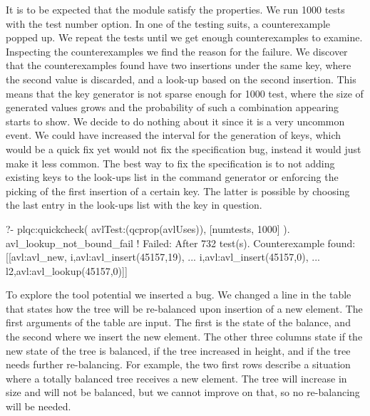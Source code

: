 It is to be expected that the module satisfy the properties.
%
We run 1000 tests with the test number option.
%
In one of the testing suits, a counterexample popped up.
%
We repeat the tests until we get enough counterexamples to examine.
%
Inspecting the counterexamples we find the reason for the failure.
%
We discover that the counterexamples found have two insertions under the
same key, where the second value is discarded, and a look-up based on
the second insertion.
%
This means that the key generator is not sparse enough for 1000 test,
where the size of generated values grows and the probability of such a
combination appearing starts to show.
%
We decide to do nothing about it since it is a very uncommon event.
%
We could have increased the interval for the generation of keys, which
would be a quick fix yet would not fix the specification bug, instead it would just
make it less common.
%
The best way to fix the specification is to not adding existing keys to
the look-ups list in the command generator or enforcing the picking of
the first insertion of a certain key.
%
The latter is possible by choosing the last entry in the look-ups list
with the key in question.
%
\begin{yapcode}
   ?- plqc:quickcheck(
                avlTest:(qcprop(avlUses)),
                [{numtests, 1000}] ).
 avl_lookup_not_bound_fail
 !
 Failed: After 732 test(s).
 Counterexample found: [[avl:avl_new,
     {i,avl:avl_insert(45157,19)}, ...
     {i,avl:avl_insert(45157,0)}, ...
     {l2,avl:avl_lookup(45157,0)}]] 
\end{yapcode}





To explore the tool potential we inserted a bug.
%
We changed a line in the table that states how the tree will be
re-balanced upon insertion of a new element.
%
The first arguments of the table are input.
%
The first is the state of the balance, and the second where we insert
the new element.
%
The other three columns state if the new state of the tree is balanced,
if the tree increased in height, and if the tree needs further
re-balancing.
%
For example, the two first rows describe a situation where a totally
balanced tree receives a new element.
%
The tree will increase in size and will not be balanced, but we cannot
improve on that, so no re-balancing will be needed.

